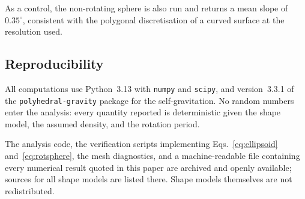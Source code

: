 As a control, the non-rotating sphere is also run and returns a mean slope of
$0.35^{\circ}$, consistent with the polygonal discretisation of a curved
surface at the resolution used.

\subsection{Reproducibility}
\label{sec:repro}

All computations use Python~3.13 with \texttt{numpy} and \texttt{scipy}, and
version~3.3.1 of the \texttt{polyhedral-gravity} package \citep{gravitylib}
for the self-gravitation. No random numbers enter the analysis: every quantity
reported is deterministic given the shape model, the assumed density, and the
rotation period.

The analysis code, the verification scripts implementing
Eqs.~\eqref{eq:ellipsoid} and~\eqref{eq:rotsphere}, the mesh diagnostics, and a
machine-readable file containing every numerical result quoted in this paper are
archived and openly available; sources for all shape models are listed there.
Shape models themselves are not redistributed.
